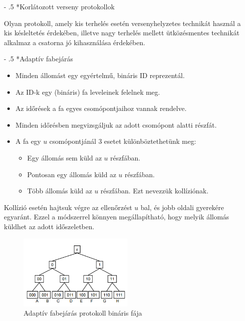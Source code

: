 \documentclass[12pt]{article}
\makeatletter
\renewcommand\paragraph{%
	\@startsection{paragraph}{4}{0mm}%
	{-\baselineskip}%
	{.5\baselineskip}%
	{\normalfont\normalsize\bfseries}}
\makeatother
\begin{document}
    \paragraph*{Korlátozott verseny protokollok}

    Olyan protokoll, amely kis terhelés esetén versenyhelyzetes technikát használ a kis késleltetés érdekében, illetve nagy terhelés mellett ütközésmentes technikát alkalmaz a csatorna jó kihasználása érdekében.

    \paragraph*{\small Adaptív fabejárás}

    \begin{itemize}[leftmargin=7.5mm]
        \renewcommand{\labelitemi}{$\vcenter{\hbox{\tiny$\bullet$}}$}
        \item Minden állomást egy egyértelmű, bináris ID reprezentál.
        \item Az ID-k egy (bináris) fa leveleinek felelnek meg.
        \item Az időrések a fa egyes csomópontjaihoz vannak rendelve.
        \item Minden időrésben megvizsgáljuk az adott csomópont alatti részfát.
        \item A fa egy $u$ csomópontjánál 3 esetet különböztethetünk meg:
        \begin{itemize}[leftmargin=7.5mm]
            \renewcommand{\labelitemii}{$\vcenter{\hbox{\tiny$\circ$}}$}
            \item Egy állomás sem küld az $u$ részfában.
            \item Pontosan egy állomás küld az $u$ részfában.
            \item Több állomás küld az $u$ részfában. Ezt nevezzük kollíziónak.
        \end{itemize}
    \end{itemize}
    Kollízió esetén hajtsuk végre az ellenőrzést $u$ bal, és jobb oldali gyerekére egyaránt. Ezzel a módszerrel könnyen megállapítható, hogy melyik állomás küldhet az adott időszeletben.
        \begin{figure}[H]
            \centering
            \includegraphics[width=0.5\textwidth]{img/adaptivfa.png}
            \caption{Adaptív fabejárás protokoll bináris fája}	
        \end{figure}
\end{document}
